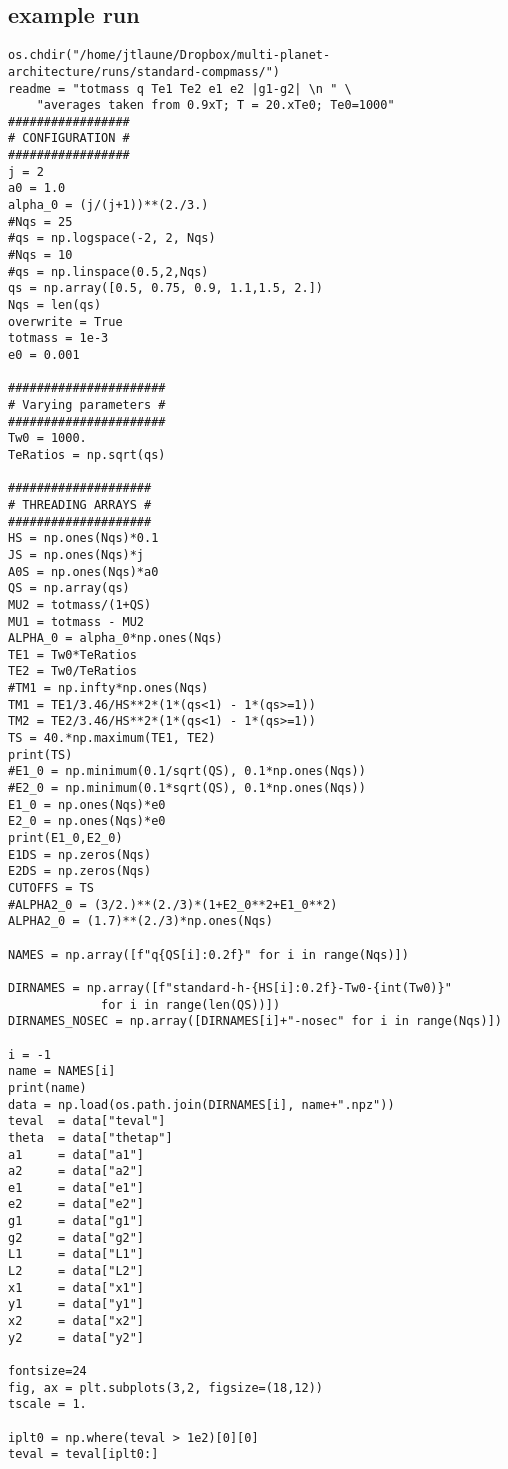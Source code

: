 \documentclass[11pt]{article}
\begin{document}
\subsection{example run}
\label{sec:org9bd1a32}
\begin{verbatim}
os.chdir("/home/jtlaune/Dropbox/multi-planet-architecture/runs/standard-compmass/")
readme = "totmass q Te1 Te2 e1 e2 |g1-g2| \n " \
    "averages taken from 0.9xT; T = 20.xTe0; Te0=1000"
#################
# CONFIGURATION #
#################
j = 2
a0 = 1.0
alpha_0 = (j/(j+1))**(2./3.)
#Nqs = 25
#qs = np.logspace(-2, 2, Nqs)
#Nqs = 10
#qs = np.linspace(0.5,2,Nqs)
qs = np.array([0.5, 0.75, 0.9, 1.1,1.5, 2.])
Nqs = len(qs)
overwrite = True
totmass = 1e-3
e0 = 0.001

######################
# Varying parameters #
######################
Tw0 = 1000.
TeRatios = np.sqrt(qs)

####################
# THREADING ARRAYS #
####################
HS = np.ones(Nqs)*0.1
JS = np.ones(Nqs)*j
A0S = np.ones(Nqs)*a0
QS = np.array(qs)
MU2 = totmass/(1+QS)
MU1 = totmass - MU2
ALPHA_0 = alpha_0*np.ones(Nqs)
TE1 = Tw0*TeRatios
TE2 = Tw0/TeRatios
#TM1 = np.infty*np.ones(Nqs)
TM1 = TE1/3.46/HS**2*(1*(qs<1) - 1*(qs>=1))
TM2 = TE2/3.46/HS**2*(1*(qs<1) - 1*(qs>=1))
TS = 40.*np.maximum(TE1, TE2)
print(TS)
#E1_0 = np.minimum(0.1/sqrt(QS), 0.1*np.ones(Nqs))
#E2_0 = np.minimum(0.1*sqrt(QS), 0.1*np.ones(Nqs))
E1_0 = np.ones(Nqs)*e0
E2_0 = np.ones(Nqs)*e0
print(E1_0,E2_0)
E1DS = np.zeros(Nqs)
E2DS = np.zeros(Nqs)
CUTOFFS = TS
#ALPHA2_0 = (3/2.)**(2./3)*(1+E2_0**2+E1_0**2)
ALPHA2_0 = (1.7)**(2./3)*np.ones(Nqs)

NAMES = np.array([f"q{QS[i]:0.2f}" for i in range(Nqs)])

DIRNAMES = np.array([f"standard-h-{HS[i]:0.2f}-Tw0-{int(Tw0)}"
		     for i in range(len(QS))])
DIRNAMES_NOSEC = np.array([DIRNAMES[i]+"-nosec" for i in range(Nqs)])

i = -1
name = NAMES[i]
print(name)
data = np.load(os.path.join(DIRNAMES[i], name+".npz"))
teval  = data["teval"]
theta  = data["thetap"]
a1     = data["a1"]
a2     = data["a2"]
e1     = data["e1"]
e2     = data["e2"]
g1     = data["g1"]
g2     = data["g2"]
L1     = data["L1"]
L2     = data["L2"]
x1     = data["x1"]
y1     = data["y1"]
x2     = data["x2"]
y2     = data["y2"]

fontsize=24
fig, ax = plt.subplots(3,2, figsize=(18,12))
tscale = 1.

iplt0 = np.where(teval > 1e2)[0][0]
teval = teval[iplt0:]


\end{verbatim}
\end{document}
